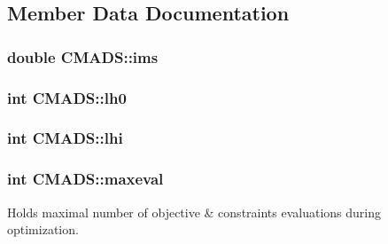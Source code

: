 \subsection{Member Data Documentation}
\hypertarget{class_c_m_a_d_s_a6274e43889cea689ac1bc2d3f2895528}{
\subsubsection[{ims}]{\setlength{\rightskip}{0pt plus 5cm}double C\-M\-A\-D\-S\-::ims\hspace{0.3cm}{\ttfamily [protected]}}}\label{class_c_m_a_d_s_a6274e43889cea689ac1bc2d3f2895528}
\hypertarget{class_c_m_a_d_s_a4eaead3a0de0217d182cd70b858c066f}{
\subsubsection[{lh0}]{\setlength{\rightskip}{0pt plus 5cm}int C\-M\-A\-D\-S\-::lh0\hspace{0.3cm}{\ttfamily [protected]}}}\label{class_c_m_a_d_s_a4eaead3a0de0217d182cd70b858c066f}
\hypertarget{class_c_m_a_d_s_ac6c70518f5b7d42b32f656419406ed7a}{
\subsubsection[{lhi}]{\setlength{\rightskip}{0pt plus 5cm}int C\-M\-A\-D\-S\-::lhi\hspace{0.3cm}{\ttfamily [protected]}}}\label{class_c_m_a_d_s_ac6c70518f5b7d42b32f656419406ed7a}
\hypertarget{class_c_m_a_d_s_ade4448bc470dc7c4c64f890c87f762da}{
\subsubsection[{maxeval}]{\setlength{\rightskip}{0pt plus 5cm}int C\-M\-A\-D\-S\-::maxeval\hspace{0.3cm}{\ttfamily [protected]}}}\label{class_c_m_a_d_s_ade4448bc470dc7c4c64f890c87f762da}


Holds maximal number of objective \& constraints evaluations during optimization. 

